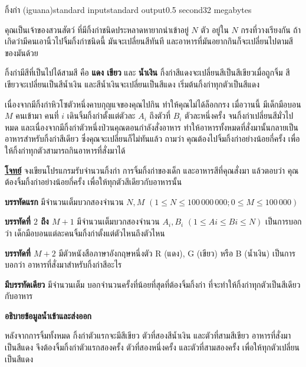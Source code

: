 \documentclass[11pt,a4paper]{article}
\begin{document}
\begin{problem}{กิ้งก่า (iguana)}{standard input}{standard output}{0.5 second}{32 megabytes}

คุณเป็นเจ้าของสวนสัตว์ ที่มีกิ้งก่าชนิดประหลาดหายากนำเข้าอยู่ $N$ ตัว อยู่ใน $N$ กรงที่วางเรียงกัน ถ้าเกิดว่ามีคนเอานิ้วไปจิ้มกิ้งก่าชนิดนี้ มันจะเปลี่ยนสีทันที และอาหารที่มันอยากกินก็จะเปลี่ยนไปตามสีของมันด้วย

    กิ้งก่ามีสีที่เป็นไปได้สามสี คือ \textbf{แดง เขียว} และ \textbf{น้ำเงิน} กิ้งก่าสีแดงจะเปลี่ยนสีเป็นสีเขียวเมื่อถูกจิ้ม สีเขียวจะเปลี่ยนเป็นสีน้ำเงิน และสีน้ำเงินจะเปลี่ยนเป็นสีแดง เริ่มต้นกิ้งก่าทุกตัวเป็นสีแดง
    
    เนื่องจากมีกิ้งก่าหิวโซตัวหนึ่งคาบกุญแจของคุณไปกิน ทำให้คุณไม่ได้ล็อกกรง เมื่อวานนี้ มีเด็กมือบอน $M$ คนเข้ามา คนที่ $i$ เดินจิ้มกิ้งก่าตั้งแต่ตัวละ $A_i$ ถึงตัวที่ $B_i$ ตัวละหนึ่งครั้ง จนกิ้งก่าเปลี่ยนสีมั่วไปหมด
    และเนื่องจากมีกิ้งก่าตัวหนึ่งป่วนคุณตอนกำลังสั่งอาหาร ทำให้อาหารทั้งหมดที่สั่งมานั้นกลายเป็นอาหารสำหรับกิ้งก่าสีเดียว ซึ่งคุณจะเปลี่ยนก็ไม่ทันแล้ว ถามว่า คุณต้องไปจิ้มกิ้งก่าอย่างน้อยกี่ครั้ง เพื่อให้กิ้งก่าทุกตัวสามารถกินอาหารที่สั่งมาได้

\bigskip
\underline{\textbf{โจทย์}}  จงเขียนโปรแกรมรับจำนวนกิ้งก่า การจิ้มกิ้งก่าของเด็ก และอาหารสีที่คุณสั่งมา แล้วตอบว่า คุณต้องจิ้มกิ้งก่าอย่างน้อยกี่ครั้ง เพื่อให้ทุกตัวสีเดียวกับอาหารนั้น

\InputFile

\textbf{บรรทัดแรก} มีจำนวนเต็มบวกสองจำนวน $N, M$ $(1 \leq N \leq 100\,000\,000; 0 \leq M \leq 100\,000)$

\textbf{บรรทัดที่ $2$ ถึง $M+1$} มีจำนวนเต็มบวกสองจำนวน $A_i, B_i$ $(1 \leq Ai \leq Bi \leq N)$ เป็นการบอกว่า เด็กมือบอนแต่ละคนจิ้มกิ้งก่าตั้งแต่ตัวไหนถึงตัวไหน

\textbf{บรรทัดที่ $M+2$} มีตัวหนังสือภาษาอังกฤษหนึ่งตัว R (แดง), G (เขียว) หรือ B (น้ำเงิน) เป็นการบอกว่า อาหารที่สั่งมาสำหรับกิ้งก่าสีอะไร


\OutputFile

\textbf{มีบรรทัดเดียว} มีจำนวนเต็ม บอกจำนวนครั้งที่น้อยที่สุดที่ต้องจิ้มกิ้งก่า ที่จะทำให้กิ้งก่าทุกตัวเป็นสีเดียวกับอาหาร

\Examples

\begin{example}
%
\end{example}

\Note 

\textbf{อธิบายข้อมูลน้ำเข้าและส่งออก}

          หลังจากการจิ้มทั้งหมด กิ้งก่าตัวแรกจะมีสีเขียว ตัวที่สองสีน้ำเงิน และตัวที่สามสีเขียว อาหารที่สั่งมาเป็นสีแดง จึงต้องจิ้มกิ้งก่าตัวแรกสองครั้ง ตัวที่สองหนึ่งครั้ง และตัวที่สามสองครั้ง เพื่อให้ทุกตัวเปลี่ยนเป็นสีแดง


\end{problem}
\end{document}
